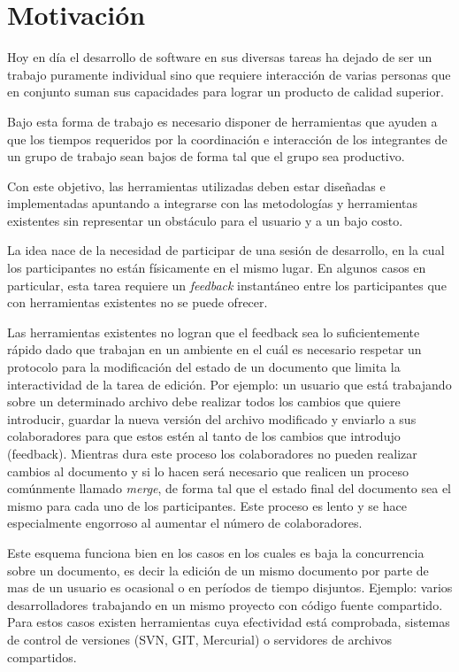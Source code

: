 \documentclass[12pt,a4paper]{article}
\begin{document}
	\section{Motivación}
Hoy en día el desarrollo de software en sus diversas tareas ha dejado de ser un trabajo 
puramente individual sino que requiere interacción de varias personas que en conjunto 
suman sus capacidades para lograr un producto de calidad superior.

Bajo esta forma de trabajo es necesario disponer de herramientas que ayuden a que los tiempos
requeridos por la coordinación e interacción de los integrantes de un grupo de trabajo sean bajos
de forma tal que el grupo sea productivo.

Con este objetivo, las herramientas utilizadas deben estar diseñadas e implementadas apuntando a
integrarse con las metodologías y herramientas existentes sin representar un obstáculo para el usuario
y a un bajo costo.

La idea nace de la necesidad de participar de una sesión de desarrollo, en la cual los participantes
no están físicamente en el mismo lugar. En algunos casos en particular, esta tarea requiere un
\textit{feedback} instantáneo entre los participantes que con herramientas existentes no se puede 
ofrecer.

Las herramientas existentes no logran que el feedback sea lo suficientemente rápido dado que trabajan
en un ambiente en el cuál es necesario respetar un protocolo para la modificación del estado de un 
documento que limita la interactividad de la tarea de edición. Por ejemplo: un usuario que está trabajando
sobre un determinado archivo debe realizar todos los cambios que quiere introducir, guardar la
nueva versión del archivo modificado y enviarlo a sus colaboradores para que estos estén al tanto de los 
cambios que introdujo (feedback). Mientras dura este proceso los colaboradores no pueden realizar cambios 
al documento y si lo hacen será necesario que realicen un proceso comúnmente llamado \textit{merge}, de forma
tal que el estado final del documento sea el mismo para cada uno de los participantes. 
Este proceso es lento y se hace especialmente engorroso al aumentar el número de colaboradores.

Este esquema funciona bien en los casos en los cuales es baja la concurrencia sobre un documento,
es decir la edición de un mismo documento por parte de mas de un usuario es ocasional o en períodos de
tiempo disjuntos. Ejemplo: varios desarrolladores trabajando en un mismo proyecto con código fuente
compartido. Para estos casos existen herramientas cuya efectividad está comprobada, sistemas de control
de versiones (SVN, GIT, Mercurial) o servidores de archivos compartidos.
\end{document}
